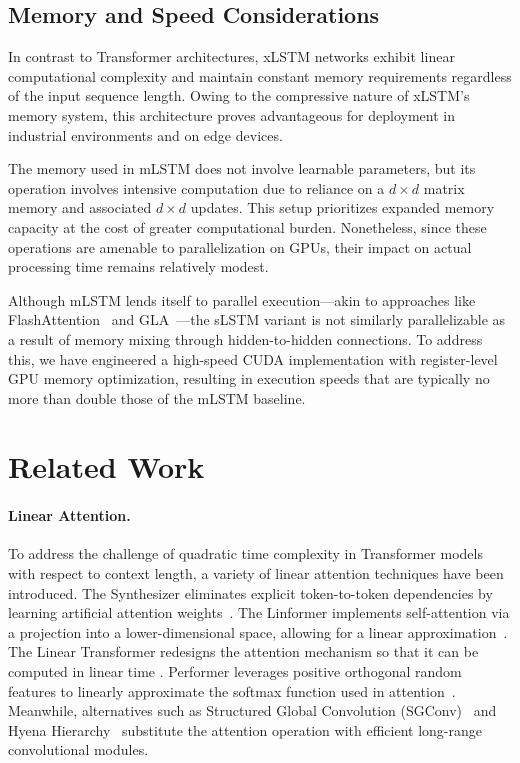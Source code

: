 \subsection{Memory and Speed Considerations}

In contrast to Transformer architectures, xLSTM networks exhibit linear computational complexity and maintain constant memory requirements regardless of the input sequence length. Owing to the compressive nature of xLSTM’s memory system, this architecture proves advantageous for deployment in industrial environments and on edge devices.

The memory used in mLSTM does not involve learnable parameters, but its operation involves intensive computation due to reliance on a $d \times d$ matrix memory and associated $d \times d$ updates. This setup prioritizes expanded memory capacity at the cost of greater computational burden. Nonetheless, since these operations are amenable to parallelization on GPUs, their impact on actual processing time remains relatively modest.

Although mLSTM lends itself to parallel execution—akin to approaches like FlashAttention~\citep{Dao:22,Dao:23} and GLA~\citep{Yang:23arxiv}—the sLSTM variant is not similarly parallelizable as a result of memory mixing through hidden-to-hidden connections. To address this, we have engineered a high-speed CUDA implementation with register-level GPU memory optimization, resulting in execution speeds that are typically no more than double those of the mLSTM baseline.

\section{Related Work}
\label{sec:related}

\paragraph{Linear Attention.} To address the challenge of quadratic time complexity in Transformer models with respect to context length, a variety of linear attention techniques have been introduced. The Synthesizer eliminates explicit token-to-token dependencies by learning artificial attention weights~\citep{Tay:20arxiv}. The Linformer implements self-attention via a projection into a lower-dimensional space, allowing for a linear approximation~\citep{Wang:20arxiv}. The Linear Transformer redesigns the attention mechanism so that it can be computed in linear time \citep{Katharopoulos:20}. Performer leverages positive orthogonal random features to linearly approximate the softmax function used in attention~\citep{Choromanski:21}. Meanwhile, alternatives such as Structured Global Convolution (SGConv)~\citep{Li:22} and Hyena Hierarchy~\citep{Poli:23} substitute the attention operation with efficient long-range convolutional modules.

